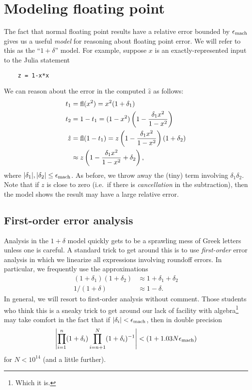 \documentclass[12pt, leqno]{article} %
\begin{document}

\section{Modeling floating point}

The fact that normal floating point results have a relative error
bounded by $\epsilon_{\mathrm{mach}}$ gives us a useful {\em model} for reasoning about
floating point error.  We will refer to this as the ``$1 + \delta$''
model.  For example, suppose $x$ is an exactly-represented input to
the Julia statement
\begin{lstlisting}
    z = 1-x*x
\end{lstlisting}
We can reason about the error in the computed $\hat{z}$ as follows:
\begin{align*}
  t_1 &= \operatorname{fl}(x^2) = x^2 (1+\delta_1) \\
  t_2 &= 1-t_1 = (1-x^2)\left( 1 - \frac{\delta_1 x^2}{1-x^2} \right) \\
  \hat{z}
  &= \operatorname{fl}(1-t_1)
    = z \left( 1 - \frac{\delta_1 x^2}{1-x^2} \right)(1+\delta_2) \\
  & \approx z \left( 1 - \frac{\delta_1 x^2}{1-x^2} +\delta_2 \right),
\end{align*}
where $|\delta_1|, |\delta_2| \leq \epsilon_{\mathrm{mach}}$.  As before, we throw
away the (tiny) term involving $\delta_1 \delta_2$.
Note that if $z$ is close to zero (i.e.~if there is {\em cancellation} in the
subtraction), then the model shows the result may have a
large relative error.

\subsection{First-order error analysis}

Analysis in the $1+\delta$ model quickly gets to be a sprawling mess
of Greek letters unless one is careful.  A standard trick to get
around this is to use {\em first-order} error analysis in which we
linearize all expressions involving roundoff errors.  In particular,
we frequently use the approximations
\begin{align*}
  (1+\delta_1)(1+\delta_2) & \approx 1+\delta_1 + \delta_2 \\
  1/(1+\delta) & \approx 1-\delta.
\end{align*}
In general, we will resort to first-order analysis without comment.
Those students who think this is a sneaky trick to get around our
lack of facility with algebra\footnote{%
Which it is.
}
may take comfort in the fact that if $|\delta_i| < \epsilon_{\mathrm{mach}}$, then
in double precision
\[
  \left| \prod_{i=1}^n (1+\delta_i) \prod_{i=n+1}^N (1+\delta_i)^{-1} \right| < (1+1.03 N \epsilon_{\mathrm{mach}})
\]
for $N < 10^{14}$ (and a little further).
\end{document}
